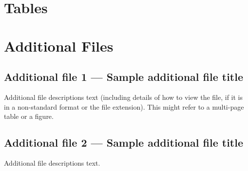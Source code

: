 \documentclass{bmcart}
\begin{document}
\begin{backmatter}

\section*{Tables}



\section*{Additional Files}
  \subsection*{Additional file 1 --- Sample additional file title}
    Additional file descriptions text (including details of how to
    view the file, if it is in a non-standard format or the file extension).  This might
    refer to a multi-page table or a figure.

  \subsection*{Additional file 2 --- Sample additional file title}
    Additional file descriptions text.

\end{backmatter}
\end{document}
